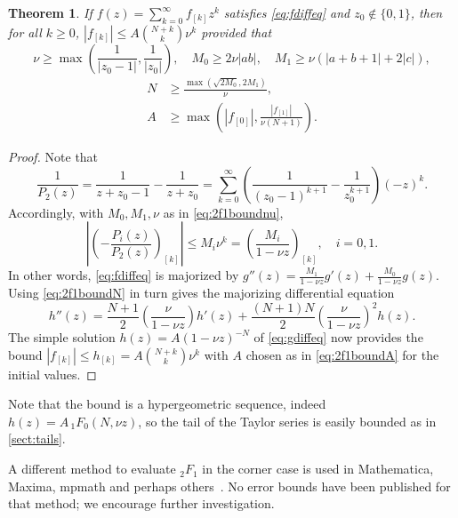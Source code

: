 \documentclass[11pt,a4paper]{article}
\newtheorem{theorem}{Theorem}
\begin{document}
\begin{theorem}
If $f(z) = \sum_{k=0}^{\infty} f_{[k]} z^k$ satisfies \eqref{eq:fdiffeq} and $z_0 \not \in \{0,1\}$, then
for all $k \ge 0$,
$|f_{[k]}| \le A \binom{N+k}{k} \nu^k$
provided that
\begin{equation}
\label{eq:2f1boundnu} \nu \ge \max\left(\frac{1}{|z_0-1|}, \frac{1}{|z_0|}\right), \quad M_0 \ge 2 \nu |ab|, \quad M_1 \ge \nu (|a+b+1| + 2|c|),
\end{equation}
\begin{align}
\label{eq:2f1boundN} N &\ge \frac{\max(\sqrt{2 M_0}, 2 M_1)}{\nu}, \\
\label{eq:2f1boundA} A &\ge \max\left(|f_{[0]}|, \frac{|f_{[1]}|}{\nu (N+1)}\right).
\end{align}
\end{theorem}

\begin{proof}
Note that
\begin{equation*}
\frac{1}{P_2(z)} = \frac{1}{z+z_0-1} - \frac{1}{z+z_0} =
\sum_{k=0}^{\infty} \left(\frac{1}{(z_0-1)^{k+1}} - \frac{1}{z_0^{k+1}}\right) (-z)^k.
\end{equation*}
Accordingly, with $M_0, M_1, \nu$ as in \eqref{eq:2f1boundnu},
\begin{equation*}
\left|\left(-\frac{P_i(z)}{P_2(z)}\right)_{[k]}\right| \le M_i \nu^k = \left(\frac{M_i}{1-\nu z}\right)_{[k]},
\quad i = 0,1.
\end{equation*}
In other words, \eqref{eq:fdiffeq} is majorized by
$g''(z) = \frac{M_1}{1-\nu z} g'(z) + \frac{M_0}{1-\nu z} g(z).$
Using \eqref{eq:2f1boundN} in turn gives the majorizing differential equation
\begin{equation}
h''(z) = \frac{N+1}{2} \left( \frac{\nu}{1-\nu z} \right) h'(z)
+ \frac{(N+1)N}{2} \left( \frac{\nu}{1-\nu z} \right)^2 h(z).
\label{eq:gdiffeq}
\end{equation}
The simple solution $h(z) = A (1-\nu z)^{-N}$
of \eqref{eq:gdiffeq} now provides the bound
$|f_{[k]}| \le h_{[k]} = A \binom{N+k}{k} \nu^k$
with $A$ chosen as in \eqref{eq:2f1boundA} for the initial values.
\end{proof}

Note that the bound
is a hypergeometric sequence, indeed $h(z) = A \, {}_1F_0(N,\nu z)$,
so the tail of the Taylor series
is easily bounded as in \cref{sect:tails}.

A different method to evaluate ${}_2F_1$ in the corner case
is used in Mathematica, Maxima, mpmath and perhaps
others~\cite{maxgosp,vogtgosp}. No error bounds have been published
for that method; we encourage further investigation.
\end{document}
